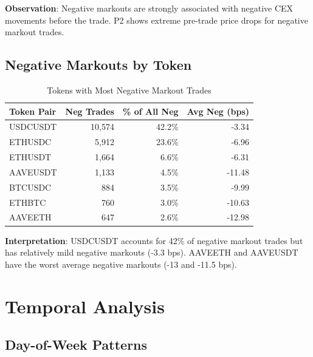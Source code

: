 \documentclass[11pt,a4paper]{article}
\begin{document}
\textbf{Observation}: Negative markouts are strongly associated with negative CEX movements before the trade. P2 shows extreme pre-trade price drops for negative markout trades.

\subsection{Negative Markouts by Token}

\begin{table}[H]
\centering
\caption{Tokens with Most Negative Markout Trades}
\begin{tabular}{lrrr}
\toprule
\textbf{Token Pair} & \textbf{Neg Trades} & \textbf{\% of All Neg} & \textbf{Avg Neg (bps)} \\
\midrule
USDCUSDT & 10,574 & 42.2\% & -3.34 \\
ETHUSDC & 5,912 & 23.6\% & -6.96 \\
ETHUSDT & 1,664 & 6.6\% & -6.31 \\
AAVEUSDT & 1,133 & 4.5\% & -11.48 \\
BTCUSDC & 884 & 3.5\% & -9.99 \\
ETHBTC & 760 & 3.0\% & -10.63 \\
AAVEETH & 647 & 2.6\% & -12.98 \\
\bottomrule
\end{tabular}
\end{table}

\textbf{Interpretation}: USDCUSDT accounts for 42\% of negative markout trades but has relatively mild negative markouts (-3.3 bps). AAVEETH and AAVEUSDT have the worst average negative markouts (-13 and -11.5 bps).

\section{Temporal Analysis}

\subsection{Day-of-Week Patterns}
\end{document}
